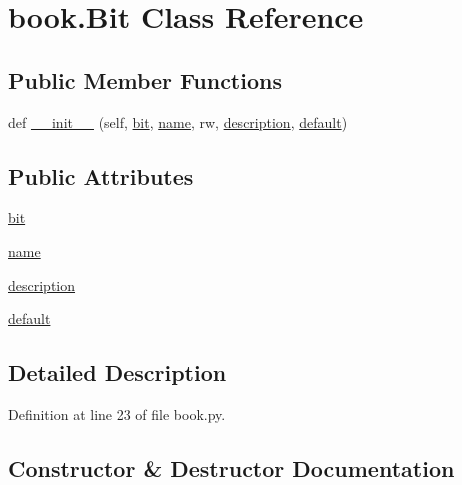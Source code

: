 \hypertarget{classbook_1_1_bit}{}\section{book.\+Bit Class Reference}
\label{classbook_1_1_bit}
\subsection*{Public Member Functions}
\begin{DoxyCompactItemize}
\item 
def \hyperlink{classbook_1_1_bit_aeeb01a2cd15f2310545fea0375e0605e}{\+\_\+\+\_\+init\+\_\+\+\_\+} (self, \hyperlink{classbook_1_1_bit_a1be5eebd7ed2c3383bf08eecc1dcd24f}{bit}, \hyperlink{classbook_1_1_bit_a37f0afda871e4a61488aee20da6c9a50}{name}, rw, \hyperlink{classbook_1_1_bit_ab61abe9a7a3607b1c91b23258b839919}{description}, \hyperlink{classbook_1_1_bit_a0edd6ba5cc0dcee4a282b5afda00cf28}{default})
\end{DoxyCompactItemize}
\subsection*{Public Attributes}
\begin{DoxyCompactItemize}
\item 
\hyperlink{classbook_1_1_bit_a1be5eebd7ed2c3383bf08eecc1dcd24f}{bit}
\item 
\hyperlink{classbook_1_1_bit_a37f0afda871e4a61488aee20da6c9a50}{name}
\item 
\hyperlink{classbook_1_1_bit_ab61abe9a7a3607b1c91b23258b839919}{description}
\item 
\hyperlink{classbook_1_1_bit_a0edd6ba5cc0dcee4a282b5afda00cf28}{default}
\end{DoxyCompactItemize}


\subsection{Detailed Description}


Definition at line 23 of file book.\+py.



\subsection{Constructor \& Destructor Documentation}
